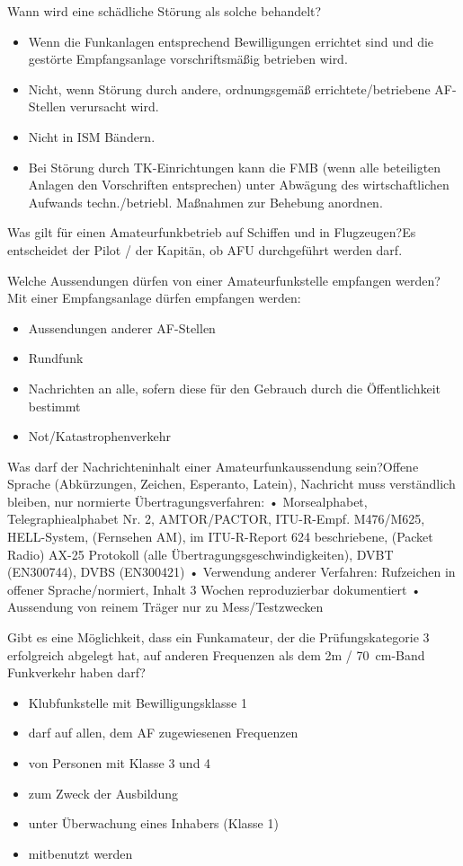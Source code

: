 \documentclass[avery5371,grid,frame,a4paper]{flashcards}
\newcommand{\card}[3]{
  \begin{flashcard}[{\chap} -- #1]{#2}#3\end{flashcard}
}
\begin{document}
\card{47}{Wann wird eine schädliche Störung als solche behandelt?}{\small{\begin{itemize}\itemsep0pt \item Wenn die Funkanlagen entsprechend Bewilligungen errichtet sind und die gestörte Empfangsanlage vorschriftsmäßig betrieben wird. \item Nicht, wenn Störung durch andere, ordnungsgemäß errichtete/betriebene AF-Stellen verursacht wird. \item Nicht in ISM Bändern. \item Bei Störung durch TK-Einrichtungen kann die FMB (wenn alle beteiligten Anlagen den Vorschriften entsprechen) unter Abwägung des wirtschaftlichen Aufwands techn./betriebl. Maßnahmen zur Behebung anordnen.\end{itemize}}}

\card{48}{Was gilt für einen Amateurfunkbetrieb auf Schiffen und in Flugzeugen?}{Es entscheidet der Pilot / der Kapitän, ob AFU durchgeführt werden darf.}

\card{49}{Welche Aussendungen dürfen von einer Amateurfunkstelle empfangen werden?}{Mit einer Empfangsanlage dürfen empfangen werden: \begin{itemize}\itemsep1pt \item Aussendungen anderer AF-Stellen \item Rundfunk \item Nachrichten an alle, sofern diese für den
Gebrauch durch die Öffentlichkeit bestimmt \item Not/Katastrophenverkehr\end{itemize}}

\card{50}{Was darf der Nachrichteninhalt einer Amateurfunkaussendung sein?}{\small{Offene Sprache (Abkürzungen, Zeichen, Esperanto, Latein), Nachricht muss verständlich bleiben, nur normierte Übertragungsverfahren:
•  Morsealphabet, Telegraphiealphabet Nr. 2, AMTOR/PACTOR, ITU-R-Empf. M476/M625, HELL-System, (Fernsehen AM), im ITU-R-Report 624 beschriebene, (Packet Radio) AX-25
Protokoll (alle Übertragungsgeschwindigkeiten), DVBT (EN300744), DVBS (EN300421)
•  Verwendung anderer Verfahren: Rufzeichen in offener Sprache/normiert, Inhalt 3 Wochen reproduzierbar dokumentiert
•  Aussendung von reinem Träger nur zu Mess/Testzwecken}}

\card{51}{Gibt es eine Möglichkeit, dass ein Funkamateur, der die Prüfungskategorie 3 erfolgreich abgelegt hat, auf anderen Frequenzen als dem 2m / \SI{70}{\centi\metre}-Band Funkverkehr haben darf?}{\begin{itemize}\itemsep1pt \item Klubfunkstelle mit Bewilligungsklasse 1 \item darf auf allen, dem AF zugewiesenen Frequenzen \item von Personen mit Klasse 3 und 4 \item zum Zweck der Ausbildung \item unter Überwachung eines Inhabers (Klasse 1) \item mitbenutzt werden\end{itemize}}
\end{document}
